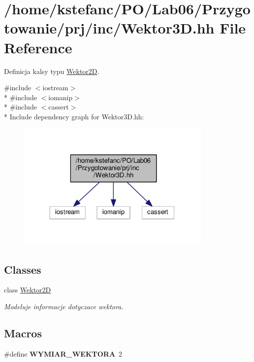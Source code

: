 \hypertarget{_wektor3_d_8hh}{\section{/home/kstefanc/\+P\+O/\+Lab06/\+Przygotowanie/prj/inc/\+Wektor3\+D.hh File Reference}
\label{_wektor3_d_8hh}
}


Definicja kalsy typu \hyperlink{class_wektor2_d}{Wektor2\+D}.  


{\ttfamily \#include $<$iostream$>$}\\*
{\ttfamily \#include $<$iomanip$>$}\\*
{\ttfamily \#include $<$cassert$>$}\\*
Include dependency graph for Wektor3\+D.\+hh\+:
\nopagebreak
\begin{figure}[H]
\begin{center}
\leavevmode
\includegraphics[width=270pt]{_wektor3_d_8hh__incl}
\end{center}
\end{figure}
\subsection*{Classes}
\begin{DoxyCompactItemize}
\item 
class \hyperlink{class_wektor2_d}{Wektor2\+D}
\begin{DoxyCompactList}\small\item\em Modeluje informacje dotyczace wektora. \end{DoxyCompactList}\end{DoxyCompactItemize}
\subsection*{Macros}
\begin{DoxyCompactItemize}
\item 
\hypertarget{_wektor3_d_8hh_a837652d626680cf1da4d0b5309b1e80a}{\#define {\bfseries W\+Y\+M\+I\+A\+R\+\_\+\+W\+E\+K\+T\+O\+R\+A}~2}\label{_wektor3_d_8hh_a837652d626680cf1da4d0b5309b1e80a}

\end{DoxyCompactItemize}
